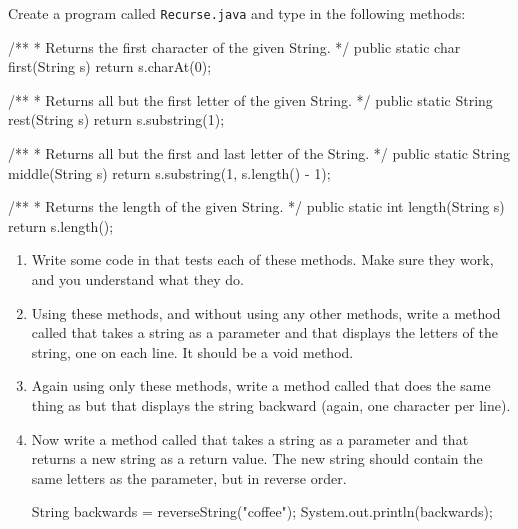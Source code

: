 \begin{exercise}  %

Create a program called {\tt Recurse.java} and type in the following methods:

\begin{code}
/**
 * Returns the first character of the given String.
 */
public static char first(String s) {
    return s.charAt(0);
}
\end{code}

\begin{code}
/**
 * Returns all but the first letter of the given String.
 */
public static String rest(String s) {
    return s.substring(1);
}
\end{code}

\begin{code}
/**
 * Returns all but the first and last letter of the String.
 */
public static String middle(String s) {
    return s.substring(1, s.length() - 1);
}
\end{code}

\begin{code}
/**
 * Returns the length of the given String.
 */
public static int length(String s) {
    return s.length();
}
\end{code}

\begin{enumerate}

\item Write some code in  that tests each of these methods.
Make sure they work, and you understand what they do.

\item Using these methods, and without using any other  methods, write a method called  that takes a string as a parameter and that displays the letters of the string, one on each line.
It should be a void method.

\item Again using only these methods, write a method called  that does the same thing as  but that displays the string backward (again, one character per line).

\item Now write a method called  that takes a string as a parameter and that returns a new string as a return value.
The new string should contain the same letters as the parameter, but in reverse order.

\begin{code}
String backwards = reverseString("coffee");
System.out.println(backwards);
\end{code}


\end{enumerate}
\end{exercise}
